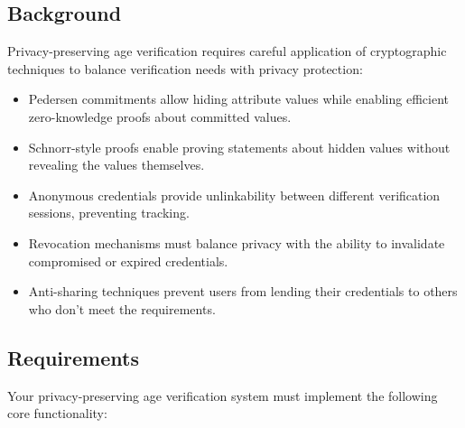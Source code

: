 \documentclass[10pt,a4paper,american]{exam}
\begin{document}
\subsection*{Background}
Privacy-preserving age verification requires careful application of cryptographic techniques to balance verification needs with privacy protection:
\begin{itemize}
	\item Pedersen commitments allow hiding attribute values while enabling efficient zero-knowledge proofs about committed values.
	\item Schnorr-style proofs enable proving statements about hidden values without revealing the values themselves.
	\item Anonymous credentials provide unlinkability between different verification sessions, preventing tracking.
	\item Revocation mechanisms must balance privacy with the ability to invalidate compromised or expired credentials.
	\item Anti-sharing techniques prevent users from lending their credentials to others who don't meet the requirements.
\end{itemize}

\subsection*{Requirements}
Your privacy-preserving age verification system must implement the following core functionality:
\end{document}

